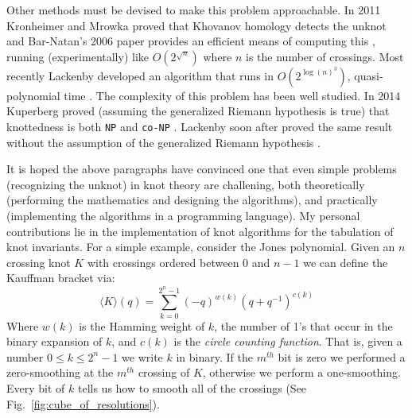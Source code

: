 \documentclass{article}
\theoremstyle{plain}
\begin{document}
        Other methods must be devised to make this problem approachable.
        In 2011 Kronheimer and Mrowka proved that Khovanov homology detects the
        unknot \cite{KronheimerMrowka2011KhovanovUnknot} and Bar-Natan's 2006
        paper provides an efficient means of computing this
        \cite{BarNatan2006FASTKH}, running (experimentally) like
        $O(2^{\sqrt{n}})$ where $n$ is the number of crossings. Most recently
        Lackenby developed an algorithm that runs in
        $O(2^{\log(n)^{3}})$, quasi-polynomial time
        \cite{LackenBy2021QuasiPolyUnknotting}. The complexity of this problem
        has been well studied. In 2014 Kuperberg proved (assuming the generalized
        Riemann hypothesis is true) that knottedness is both \texttt{NP} and
        \texttt{co-NP} \cite{Kuperberg2014KnottednessNP}. Lackenby soon after
        proved the same result without the assumption of the generalized
        Riemann hypothesis \cite{Lackenby2021UnknotNP}.
        \par\hfill\par
        It is hoped the above paragraphs have convinced one that even simple
        problems (recognizing the unknot) in knot theory are challening,
        both theoretically (performing the mathematics and designing the
        algorithms), and practically (implementing the algorithms
        in a programming language).
        My personal contributions lie in the implementation of knot algorithms
        for the tabulation of knot invariants. For a simple example,
        consider the Jones polynomial. Given an $n$ crossing knot $K$
        with crossings ordered between $0$ and $n-1$ we can define the
        Kauffman bracket via:
        \begin{equation}
            \langle{K}\rangle(q)
            =\sum_{k=0}^{2^{n}-1}(-q)^{w(k)}(q+q^{-1})^{c(k)}
        \end{equation}
        Where $w(k)$ is the Hamming weight of $k$, the number of 1's that occur
        in the binary expansion of $k$, and $c(k)$ is the
        \textit{circle counting function}. That is, given a number
        $0\leq{k}\leq{2}^{n}-1$ we write $k$ in binary. If the $m^{th}$ bit is
        zero we performed a zero-smoothing at the $m^{th}$ crossing of $K$,
        otherwise we perform a one-smoothing. Every bit of $k$ tells us how to
        smooth all of the crossings (See Fig.~\ref{fig:cube_of_resolutions}).
\end{document}

